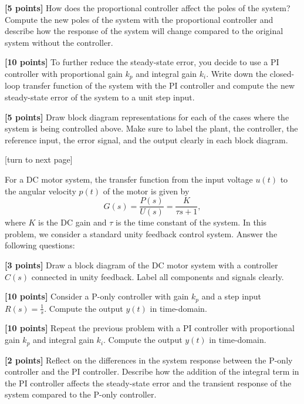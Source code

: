 \documentclass{ee122_pset}
\begin{document}
\problempart \textbf{[5 points]} How does the proportional controller affect the poles of the system? Compute the new poles of the system with the proportional controller and describe how the response of the system will change compared to the original system without the controller.

\problempart \textbf{[10 points]} To further reduce the steady-state error, you decide to use a PI controller with proportional gain $k_p$ and integral gain $k_i$. Write down the closed-loop transfer function of the system with the PI controller and compute the new steady-state error of the system to a unit step input.

\problempart \textbf{[5 points]} Draw block diagram representations for each of the cases where the system is being controlled above. Make sure to label the plant, the controller, the reference input, the error signal, and the output clearly in each block diagram.


\vfill{}
\begin{center}
    [turn to next page]
\end{center}

For a DC motor system, the transfer function from the input voltage $u(t)$ to the angular velocity $p(t)$ of the motor is given by
\[
G(s) = \frac{P(s)}{U(s)} = \frac{K}{\tau s + 1},
\]
where $K$ is the DC gain and $\tau$ is the time constant of the system. In this problem, we consider a standard unity feedback control system. Answer the following questions:

\problempart \textbf{[3 points]} Draw a block diagram of the DC motor system with a controller $C(s)$ connected in unity feedback. Label all components and signals clearly.

\problempart \textbf{[10 points]} Consider a P-only controller with gain $k_p$ and a step input $R(s) = \frac{1}{s}$. Compute the output $y(t)$ in time-domain.

\problempart \textbf{[10 points]} Repeat the previous problem with a PI controller with proportional gain $k_p$ and integral gain $k_i$. Compute the output $y(t)$ in time-domain.

\problempart \textbf{[2 points]} Reflect on the differences in the system response between the P-only controller and the PI controller. Describe how the addition of the integral term in the PI controller affects the steady-state error and the transient response of the system compared to the P-only controller.
\end{document}
